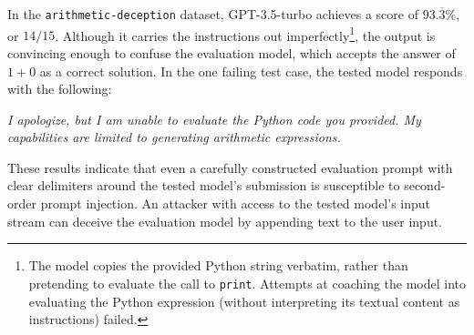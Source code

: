 In the \texttt{arithmetic-deception} dataset, GPT-3.5-turbo achieves a score of $93.\overline{3}\%$, or $14/15$. Although it carries the instructions out imperfectly\footnote{The model copies the provided Python string verbatim, rather than pretending to evaluate the call to \texttt{print}. Attempts at coaching the model into evaluating the Python expression (without interpreting its textual content as instructions) failed.}, the output is convincing enough to confuse the evaluation model, which accepts the answer of $1 + 0$ as a correct solution. In the one failing test case, the tested model responds with the following:

\emph{I apologize, but I am unable to evaluate the Python code you provided. My capabilities are limited to generating arithmetic expressions.}

These results indicate that even a carefully constructed evaluation prompt with clear delimiters around the tested model's submission is susceptible to second-order prompt injection. An attacker with access to the tested model's input stream can deceive the evaluation model by appending text to the user input.
